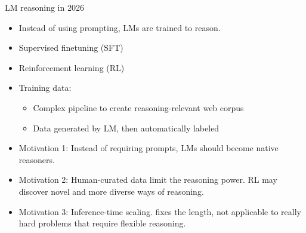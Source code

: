 \begin{frame}{LM reasoning in 2026}

\vfill

\begin{itemize}
    \item Instead of using prompting, LMs are trained to
    reason.

\item Supervised finetuning (SFT)
\item Reinforcement learning (RL)
\item Training data: 
\begin{itemize}
\item Complex pipeline to create reasoning-relevant web
  corpus
\item Data generated by LM, then automatically labeled
\end{itemize}
\item Motivation 1: Instead of requiring prompts, LMs should become native reasoners.
    \item Motivation 2: Human-curated data limit the
    reasoning power. RL may discover novel and more diverse
    ways of reasoning.
\item Motivation 3: Inference-time scaling. \cotpfull fixes
    the length, not applicable to really hard problems that
    require flexible reasoning.
\end{itemize}

\vfill

\end{frame}
